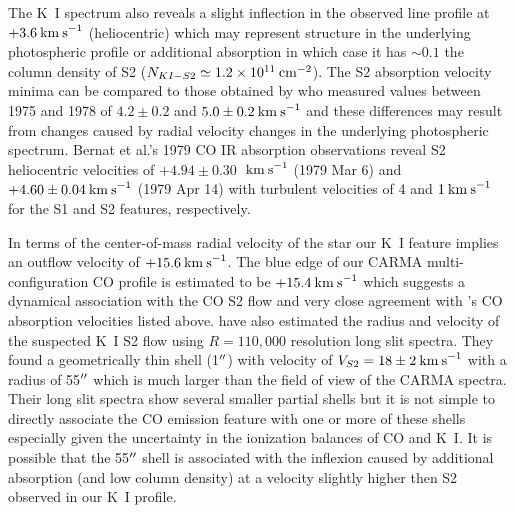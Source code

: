 \documentclass[iop]{emulateapj}
\begin{document}
The K~I spectrum also reveals a slight inflection in the observed line profile at $+3.6\>{\rm km\>s}^{-1}$ (heliocentric) which may represent structure in the underlying photospheric profile or additional absorption in which case it has $\sim 0.1$ the column density of S2 ($N_{KI-S2}\simeq 1.2\times 10^{11}\>{\rm cm}^{-2}$).  The S2 absorption velocity minima can be compared to those obtained by \citet[Fig 7]{1979QJRAS..20..361G} who measured values between 1975 and 1978 of $4.2\pm 0.2$ and $5.0\pm 0.2 \>{\rm km\>s}^{-1}$ and these differences may result from changes caused by radial velocity changes in the underlying photospheric spectrum. Bernat et al.'s 1979 CO IR absorption observations reveal S2 heliocentric velocities of $+4.94\pm 0.30$ $\>{\rm km\>s}^{-1}$ (1979 Mar 6) and $+4.60\pm 0.04 \>{\rm km\>s}^{-1}$ (1979 Apr 14) with turbulent velocities of 4 and $1\>{\rm km\>s}^{-1}$ for the S1 and S2 features, respectively.

In terms of the center-of-mass radial velocity of the star our K~I feature implies an outflow velocity of $+15.6\>{\rm km\>s}^{-1}$. The blue edge of our CARMA multi-configuration CO profile is estimated to be $+15.4\>{\rm km\>s}^{-1}$  which suggests a dynamical association with the CO S2 flow and very close agreement with \citeauthor{1979ApJ...233L.135B}'s \citeyearpar{1979ApJ...233L.135B} CO absorption velocities listed above. \cite{2002A&A...386.1009P} have also estimated the radius and velocity of the suspected K~I S2 flow using $R=110,000$ resolution long slit spectra. They found a geometrically thin shell (1$\mbox{$^{\prime\prime}$}$) with velocity of $V_{S2}=18\pm 2\>{\rm km\>s}^{-1}$ with a radius of 55$\mbox{$^{\prime\prime}$}$ which is much larger than the field of view of the CARMA spectra. Their long slit spectra show several smaller partial shells but it is not simple to directly associate the CO emission feature with one or more of these shells especially given the uncertainty in the ionization balances of CO and K~I. It is possible that the 55$\mbox{$^{\prime\prime}$}$ shell is associated with the inflexion caused by additional absorption (and low column density) at a velocity slightly higher then S2 observed in our K~I profile.
\end{document}
